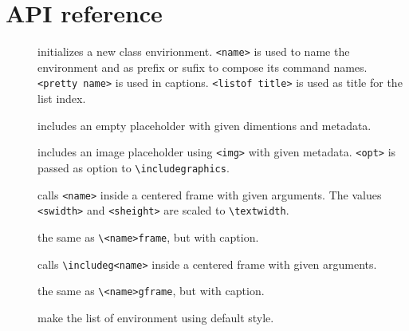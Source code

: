 \documentclass[10pt,a4paper]{article}
\begin{document}
\section{API reference}
\begin{description}
	\item[] initializes a new class envirionment. \verb|<name>| is used to name the environment and as prefix or sufix to compose its command names. \verb|<pretty name>| is used in captions. \verb|<listof title>| is used as title for the list index.
	\item[] includes an empty placeholder with given dimentions and metadata.
	\item[] includes an image placeholder using \verb|<img>| with given metadata. \verb|<opt>| is passed as option to \verb|\includegraphics|.
	\item[] calls \verb|<name>| inside a centered frame with given arguments. The values \verb|<swidth>| and \verb|<sheight>| are scaled to \verb|\textwidth|.
	\item[] the same as \verb|\<name>frame|, but with caption.
	\item[] calls \verb|\includeg<name>| inside a centered frame with given arguments.
	\item[] the same as \verb|\<name>gframe|, but with caption.
	\item[] make the list of environment using default style.
\end{description}
\end{document}
